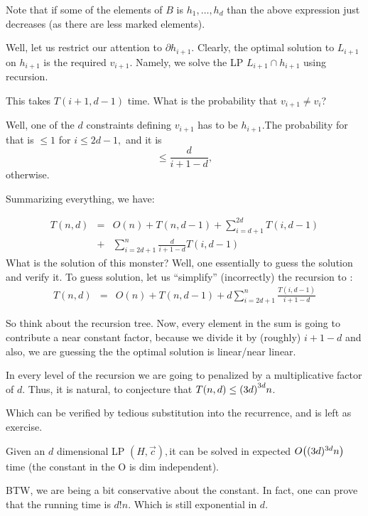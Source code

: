 Note that if some of the elements of $B$ is $h_{1},\ldots,h_{d}$
than the above expression just decreases (as there are less marked
elements).

Well, let us restrict our attention to $\partial h_{i+1}$. Clearly,
the optimal solution to $L_{i+1}$ on $h_{i+1}$ is the required $v_{i+1}$.
Namely, we solve the LP $L_{i+1}\cap h_{i+1}$ using recursion. 

This takes $T(i+1,d-1)$ time. What is the probability that $v_{i+1}\ne v_{i}$?


Well, one of the $d$ constraints defining $v_{i+1}$ has to be $h_{i+1}$.The
probability for that is $\leq1$ for $i\leq2d-1,$ and it is \[
\leq\frac{d}{i+1-d},\]
otherwise.

Summarizing everything, we have:

\begin{eqnarray*}
    T(n,d) & = & O(n)+T(n,d-1)+\sum_{i=d+1}^{2d}T(i,d-1)\\
    \  & + & \sum_{i=2d+1}^{n}\frac{d}{i+1-d}T(i,d-1)
\end{eqnarray*}
What is the solution of this monster? Well, one essentially to guess
the solution and verify it. To guess solution, let us {}``simplify''
(incorrectly) the recursion to :
\begin{eqnarray*}
    T(n,d) & = & O(n)+T(n,d-1)
     + d\sum_{i=2d+1}^{n}\frac{T(i,d-1)}{i+1-d}
\end{eqnarray*}

So think about the recursion tree. Now, every element in the sum is
going to contribute a near constant factor, because we divide it by
(roughly) $i+1-d$ and also, we are guessing the the optimal solution
is linear/near linear.

In every level of the recursion we are going to penalized by a
multiplicative factor of $d$. Thus, it is natural, to conjecture that
$T(n,d)\leq\pth{3d}^{3d}n$.

Which can be verified by tedious substitution into the recurrence,
and is left as exercise.


\begin{theorem}
    Given an $d$ dimensional LP $(H,\overrightarrow{c}),$it can be
    solved in expected $O\pth{(3d)^{3d}n}$ time (the constant in the O
    is dim independent).
\end{theorem}
BTW, we are being a bit conservative about the constant. In fact, one
can prove that the running time is $d!n$. Which is still exponential
in $d$.





